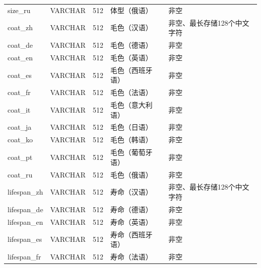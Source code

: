 \begin{longtable}[c]{@{}llrll@{}}
    size\_ru                 & VARCHAR       & 512         & 体型（俄语）       & 非空                                   \\
    coat\_zh                 & VARCHAR       & 512         & 毛色（汉语）       & 非空、最长存储128个中文字符                      \\
    coat\_de                 & VARCHAR       & 512         & 毛色（德语）       & 非空                                   \\
    coat\_en                 & VARCHAR       & 512         & 毛色（英语）       & 非空                                   \\
    coat\_es                 & VARCHAR       & 512         & 毛色（西班牙语）     & 非空                                   \\
    coat\_fr                 & VARCHAR       & 512         & 毛色（法语）       & 非空                                   \\
    coat\_it                 & VARCHAR       & 512         & 毛色（意大利语）     & 非空                                   \\
    coat\_ja                 & VARCHAR       & 512         & 毛色（日语）       & 非空                                   \\
    coat\_ko                 & VARCHAR       & 512         & 毛色（韩语）       & 非空                                   \\
    coat\_pt                 & VARCHAR       & 512         & 毛色（葡萄牙语）     & 非空                                   \\
    coat\_ru                 & VARCHAR       & 512         & 毛色（俄语）       & 非空                                   \\
    lifespan\_zh             & VARCHAR       & 512         & 寿命（汉语）       & 非空、最长存储128个中文字符                      \\
    lifespan\_de             & VARCHAR       & 512         & 寿命（德语）       & 非空                                   \\
    lifespan\_en             & VARCHAR       & 512         & 寿命（英语）       & 非空                                   \\
    lifespan\_es             & VARCHAR       & 512         & 寿命（西班牙语）     & 非空                                   \\
    lifespan\_fr             & VARCHAR       & 512         & 寿命（法语）       & 非空                                   \\

\end{longtable}
